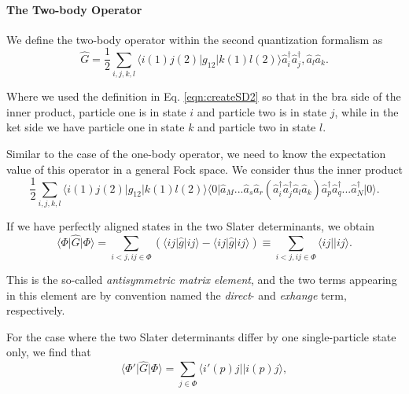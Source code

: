 \paragraph{The Two-body Operator}

We define the two-body operator within the second quantization formalism \cite{ShavittBartlett2009} as
\begin{equation}
\hat{G} = \frac{1}{2} \sum_{i,j,k,l} \langle i(1) j(2) \vert g_{12} \vert k(1) l(2) \rangle  \hat{a}_{i}^{\dagger}\hat{a}_{j}^{\dagger}, \hat{a}_{l} \hat{a}_k.
\label{eqn:twobody}
\end{equation}

Where we used the definition in Eq. \ref{eqn:createSD2} so that in the bra side of the inner product, particle one is in state $i$ and particle two is in state $j$, while in the ket side we have particle one in state $k$ and particle two in state $l$.

Similar to the case of the one-body operator, we need to know the expectation value of this operator in a general Fock space.
We consider thus the inner product
\begin{equation}
 \frac{1}{2} \sum_{i,j,k,l}    \langle i(1) j(2) \vert g_{12} \vert k(1) l(2) \rangle \langle 0\vert  \hat{a}_M ...  \hat{a}_s  \hat{a}_r (\hat{a}_{i}^{\dagger}\hat{a}_{j}^{\dagger} \hat{a}_{l} \hat{a}_k)  \hat{a}_p^\dagger \hat{a}_q^\dagger  ... \hat{a}_N^\dagger \vert 0 \rangle.
\label{eqn:sd12inner_op2}
\end{equation}

If we have perfectly aligned states in the two Slater determinants, we obtain
\begin{equation}
\langle \Phi \vert \hat{G} \vert \Phi \rangle = \sum_{i < j, ij \in \Phi} (\langle ij \vert \hat{g} \vert ij \rangle -   \langle ij \vert \hat{g} \vert ij \rangle) \equiv \sum_{i < j, ij \in \Phi}  \langle ij \vert \vert ij \rangle.
\label{eqn:antisymmetric_element}
\end{equation}

This is the so-called \emph{antisymmetric matrix element}, and the two terms appearing in this element are by convention named the \emph{direct}- and \emph{exhange} term, respectively. 

For the case where the two Slater determinants differ by one single-particle state only, we find that
\begin{equation}
\langle \Phi' \vert \hat{G} \vert \Phi \rangle = \sum_{j \in \Phi} \langle i'(p) j \vert \vert i(p)j \rangle,
\label{eqn:antisymmetric_element_2}
\end{equation}


